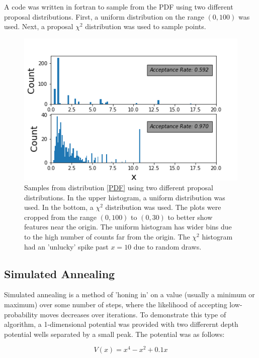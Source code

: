 \message{ !name(Assn1.tex)}\documentclass[twocolumn]{article}
\begin{document}
A code was written in fortran to sample from the PDF using two different proposal distributions. First, a uniform distribution on the range $(0,100)$ was used. Next, a proposal $\chi^2$ distribution was used to sample points.

\begin{figure}
\centering
\includegraphics[width=\linewidth]{mixed_chains}
\caption{Samples from distribution \ref{PDF} using two different proposal distributions. In the upper histogram, a uniform distribution was used. In the bottom, a $\chi^2$ distribution was used. The plots were cropped from the range $(0,100)$ to $(0,30)$ to better show features near the origin. The uniform histogram has wider bins due to the high number of counts far from the origin. The $\chi^2$ histogram had an 'unlucky' spike past $x=10$ due to random draws.}
\label{fig:mixed_chains}
\end{figure}
 

\subsection{Simulated Annealing}
Simulated annealing is a method of 'honing in' on a value (usually a minimum or maximum) over some number of steps, where the likelihood of accepting low-probability moves decreases over iterations. To demonstrate this type of algorithm, a 1-dimensional potential was provided with two differernt depth potential wells separated by a small peak. The potential was as follows:

\begin{equation}
{V(x) = x^4 - x^2 + 0.1x}
\label{eq:well}
\end{equation}
\end{document}
